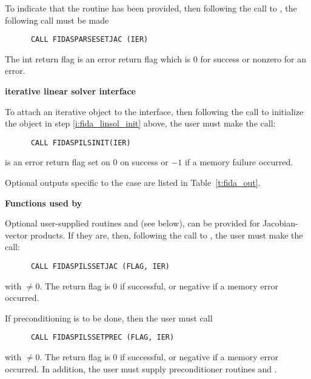 \begin{Steps}
  To indicate that the  routine has been provided, then
  following the call to , the
  following call must be made
\begin{verbatim}
      CALL FIDASPARSESETJAC (IER)
\end{verbatim}
  The int return flag  is an error return flag which is $0$
  for success or nonzero for an error.


  {\bf {\idaspils} iterative linear solver interface}

  To attach an iterative {\sunlinsol} object to the {\idaspils}
  interface, then following the call to initialize the {\sunlinsol}
  object in step \ref{i:fida_linsol_init} above, the user must make the
  call:
\begin{verbatim}
      CALL FIDASPILSINIT(IER)
\end{verbatim}
   is an error return flag set on $0$ on success or $-1$ if a memory
  failure occurred.

  Optional outputs specific to the {\idaspils} case are listed in
  Table~\ref{t:fida_out}.

  {\bf Functions used by {\idaspils}}

  Optional user-supplied routines  and 
  (see below), can be provided for Jacobian-vector products.  If they
  are, then, following the call to , the user must
  make the call:
\begin{verbatim}
      CALL FIDASPILSSETJAC (FLAG, IER)
\end{verbatim}
  with  $\neq 0$.  The return flag  is 0 if successful,
  or negative if a memory error occurred.

  If preconditioning is to be done, then the user must call
\begin{verbatim}
      CALL FIDASPILSSETPREC (FLAG, IER)
\end{verbatim}
  with  $\neq 0$.  The return flag  is 0 if successful,
  or negative if a memory error occurred.  In addition, the user must
  supply preconditioner routines  and .


\end{Steps}
